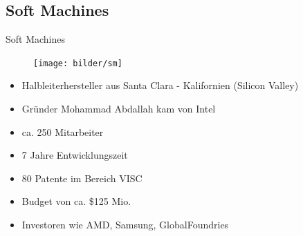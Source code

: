 \documentclass[xcolor=dvipsnames]{beamer}
\begin{document}
	\subsection{Soft Machines}
\begin{frame}{Soft Machines}
\begin{figure}
\texttt{[image: bilder/sm]}
\end{figure}
	\begin{itemize}
		\item<1-> Halbleiterhersteller aus Santa Clara - Kalifornien (Silicon Valley)
		\item Gründer Mohammad Abdallah kam von Intel 
		\item ca. 250 Mitarbeiter
		\item 7 Jahre Entwicklungszeit
		\item 80 Patente im Bereich VISC
		\item Budget von ca. \$125 Mio.
		\item Investoren wie AMD, Samsung, GlobalFoundries
	\end{itemize}
\end{frame}



\end{document}
